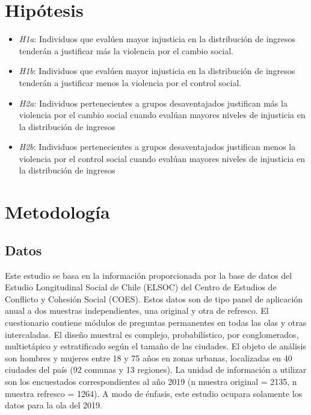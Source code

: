 \documentclass[12pt,twoside]{templates/facsothesis}
\providecommand{\tightlist}{%
  \setlength{\itemsep}{0pt}\setlength{\parskip}{0pt}}
\begin{document}
\hypertarget{hipuxf3tesis}{%
\chapter{Hipótesis}\label{hipuxf3tesis}}

\begin{itemize}
\tightlist
\item
  \emph{H1a}: Individuos que evalúen mayor injusticia en la distribución de ingresos tenderán a justificar más la violencia por el cambio social.
\item
  \emph{H1b}: Individuos que evalúen mayor injusticia en la distribución de ingresos tenderán a justificar menos la violencia por el control social.
\item
  \emph{H2a}: Individuos pertenecientes a grupos desaventajados justifican más la violencia por el cambio social cuando evalúan mayores niveles de injusticia en la distribución de ingresos
\item
  \emph{H2b}: Individuos pertenecientes a grupos desaventajados justifican menos la violencia por el control social cuando evalúan mayores niveles de injusticia en la distribución de ingresos
\end{itemize}

\hypertarget{metodologuxeda}{%
\chapter{Metodología}\label{metodologuxeda}}

\hypertarget{datos}{%
\section{Datos}\label{datos}}

Este estudio se basa en la información proporcionada por la base de datos del Estudio Longitudinal Social de Chile (ELSOC) del Centro de Estudios de Conflicto y Cohesión Social (COES). Estos datos son de tipo panel de aplicación anual a dos muestras independientes, una original y otra de refresco. El cuestionario contiene módulos de preguntas permanentes en todas las olas y otras intercaladas. El diseño muestral es complejo, probabilístico, por conglomerados, multietápico y estratificado según el tamaño de las ciudades. El objeto de análisis son hombres y mujeres entre 18 y 75 años en zonas urbanas, localizadas en 40 ciudades del país (92 comunas y 13 regiones). La unidad de información a utilizar son los encuestados correspondientes al año 2019 (n muestra original = 2135, n muestra refresco = 1264). A modo de énfasis, este estudio ocupara solamente los datos para la ola del 2019.
\end{document}
